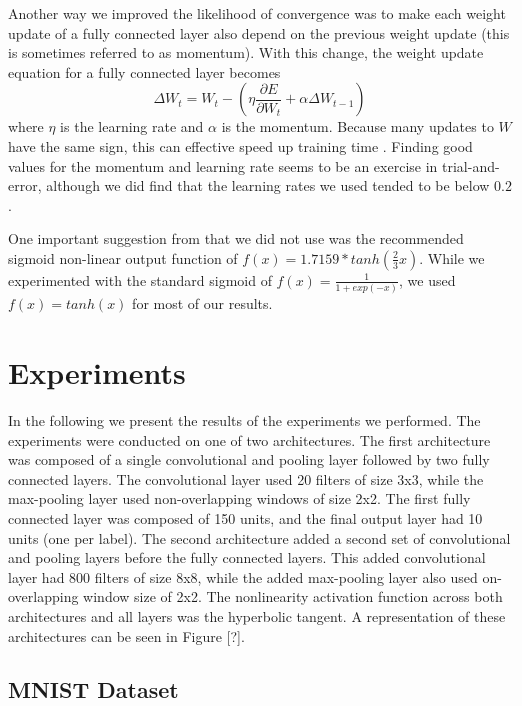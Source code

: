 \documentclass[10pt,twocolumn,letterpaper]{article}
\begin{document}
Another way we improved the likelihood of convergence was to make each weight update of a
fully connected layer also depend on the previous weight update (this is sometimes
referred to as momentum). With this change, the weight update equation for a fully connected
layer becomes
$$\Delta W_{t} = W_{t} - (\eta \frac{\partial E}{\partial W_{t}} +
\alpha \Delta W_{t-1})$$
where $\eta$ is the learning rate and $\alpha$ is the momentum.
Because many updates to $W$ have the same sign, this can effective speed up training time
\cite{WinMomentum}.
Finding good values for the momentum and learning rate seems to be
an exercise in trial-and-error, although we did find that
the learning rates we used tended to be below $0.2$.

One important suggestion from \cite{EfficientBackProp} that we did not use was the
recommended sigmoid non-linear output function of $f(x) = 1.7159 * tanh(\frac{2}{3}x)$.
While we experimented with the standard sigmoid of $f(x) = \frac{1}{1 + exp(-x)}$,
we used $f(x) = tanh(x)$ for most of our results.

\section{Experiments}

In the following we present the results of the experiments we performed. The experiments were conducted
on one of two architectures. The first architecture was composed of a single convolutional and pooling
layer followed by two fully connected layers. The convolutional layer used 20 filters of size 3x3,
while the max-pooling layer used non-overlapping windows of size 2x2. The first fully connected layer
was composed of 150 units, and the final output layer had 10 units (one per label). The second
architecture added a second set of convolutional and pooling layers before the fully connected layers.
This added convolutional layer had 800 filters of size 8x8, while the added max-pooling layer also used
on-overlapping window size of 2x2. The nonlinearity activation function across both architectures and
all layers was the hyperbolic tangent. A representation of these architectures can be seen in Figure [?].

\subsection{MNIST Dataset}
\end{document}
